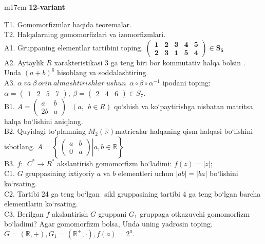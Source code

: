 \documentclass{article}
\begin{document}
\begin{tabular}{m{17cm}}
\textbf{12-variant}
\newline

T1. Gomomorfizmlar haqida teoremalar. \\
T2. Halqalarning gomomorfizlari va izomorfizmlari. \\
A1. Gruppaning elementlar tartibini toping. \(\begin{pmatrix}
\mathbf{1} & \mathbf{2} & \mathbf{3} & \mathbf{4} & \mathbf{5} \\
\mathbf{2} & \mathbf{3} & \mathbf{1} & \mathbf{5} & \mathbf{4}
\end{pmatrix}\mathbf{\in}\mathbf{S}_{\mathbf{5}}\) \\
A2. Aytaylik \(R\) xarakteristikasi 3 ga teng biri bor kommutativ halqa bo\textquotesingle lsin . Unda \((a + b)^{6}\) hisoblang va soddalashtiring. \\
A3. \(\alpha\ va\ \beta\ orin\ almashtirishlar\ ushun\ \ \alpha \circ \beta \circ \alpha^{- 1}\) ipodani toping:\(\alpha = \begin{pmatrix}
1 & 2 & 5 & 7
\end{pmatrix},\ \beta = \begin{pmatrix}
2 & 4 & 6
\end{pmatrix} \in S_{7}\). \\
B1. \(A = \begin{pmatrix}
a & b \\
2b & a
\end{pmatrix}\ \ \ (a,\ \ b \in R)\) qo`shish va ko`paytirishga nisbatan matritsa halqa bo`lishini aniqlang. \\
B2. Quyidagi to`plamning \(M_{2}(\mathbb{R})\)matricalar halqaning qism halqasi bo`lishini isbotlang. \(A = \left\{ \left. \ \begin{pmatrix}
a & b \\
0 & a
\end{pmatrix} \right|a,b\mathbb{\in R} \right\}\) \\
B3. \(f:\ \ C^{*} \rightarrow R^{*}\) akslantirish gomomorfizm bo`ladimi: \(f(z) = |z|;\) \\
C1. \(G\) gruppasining ixtiyoriy \(a\) va \(b\) elementleri uchun \(|ab| = |ba|\) bo`lishini ko`rsating. \\
C2. Tartibi 24 ga teng bo`lgan \(< a >\) sikl gruppasining tartibi 4 ga teng bo`lgan barcha elementlarin ko`rsating. \\
C3. Berilgan \(f\) akslantirish \(G\) gruppani \(G_{1}\) gruppaga o\textquotesingle tkazuvchi gomomorfizm bo`ladimi? Agar gomomorfizm bolsa, Unda uning yadrosin toping.\(G = (\mathbb{R}, + ),G_{1} = \left( \mathbb{R}^{+}, \cdot \right),f(a) = 2^{a}.\) \\

\end{tabular}
\vspace{1cm}
\end{document}
